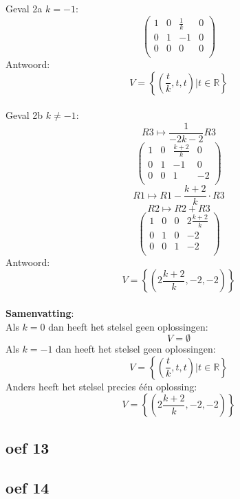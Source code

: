 \documentclass[10pt,a4paper]{article}
\begin{document}
Geval 2a $k=-1$:
\[
\begin{pmatrix}
1 & 0 & \frac{1}{k} & 0\\
0 & 1 & -1 & 0\\
0 & 0 & 0 & 0\\
\end{pmatrix}
\]
Antwoord:
\[
V=\left\lbrace\left(\frac{t}{k},t,t\right) | t \in \mathbb{R}\right\rbrace
\]\\
Geval 2b $k\neq-1$:
\[ R3 \longmapsto \frac{1}{-2k-2}R3\]
\[
\begin{pmatrix}
1 & 0 & \frac{k+2}{k} & 0\\
0 & 1 & -1 & 0\\
0 & 0 & 1 & -2\\
\end{pmatrix}
\]
\[ R1 \longmapsto R1 - \frac{k+2}{k}\cdot R3 \]
\[ R2 \longmapsto R2 + R3 \]
\[
\begin{pmatrix}
1 & 0 & 0 & 2\frac{k+2}{k}\\
0 & 1 & 0 & -2\\
0 & 0 & 1 & -2\\
\end{pmatrix}
\]
Antwoord:
\[
V=\left\lbrace\left(2\frac{k+2}{k},-2,-2\right)\right\rbrace
\]\\
\textbf{Samenvatting}:\\
Als $k=0$ dan heeft het stelsel geen oplossingen:
\[
V=\emptyset
\]
Als $k=-1$ dan heeft het stelsel geen oplossingen:
\[
V=\left\lbrace\left(\frac{t}{k},t,t\right) | t \in \mathbb{R}\right\rbrace
\]
Anders heeft het stelsel precies één oplossing:
\[
V=\left\lbrace\left(2\frac{k+2}{k},-2,-2\right)\right\rbrace
\]

\subsection*{oef 13}

\subsection*{oef 14}
\end{document}
